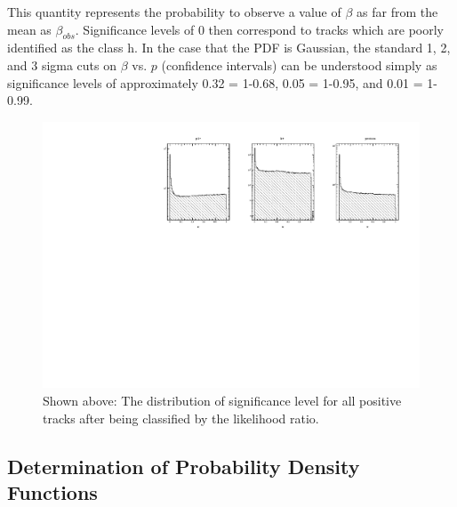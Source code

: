 This quantity represents the probability to observe a value of $\beta$ as far from the mean as $\beta_{obs}$.  Significance levels of 0 then correspond to tracks which are poorly identified as the class h.  In the case that the PDF is Gaussian, the standard 1, 2, and 3 sigma cuts on $\beta$ vs. $p$ (confidence intervals) can be understood simply as significance levels of approximately 0.32 = 1-0.68, 0.05 = 1-0.95, and 0.01 = 1-0.99.

\begin{figure}
  \begin{center}
    \includegraphics[width=14cm]{image/confidence_level.pdf}
    \caption{ Shown above: The distribution of significance level for all positive tracks after being classified by the likelihood ratio.}
  \end{center}
\end{figure}

\subsection{Determination of Probability Density Functions}

